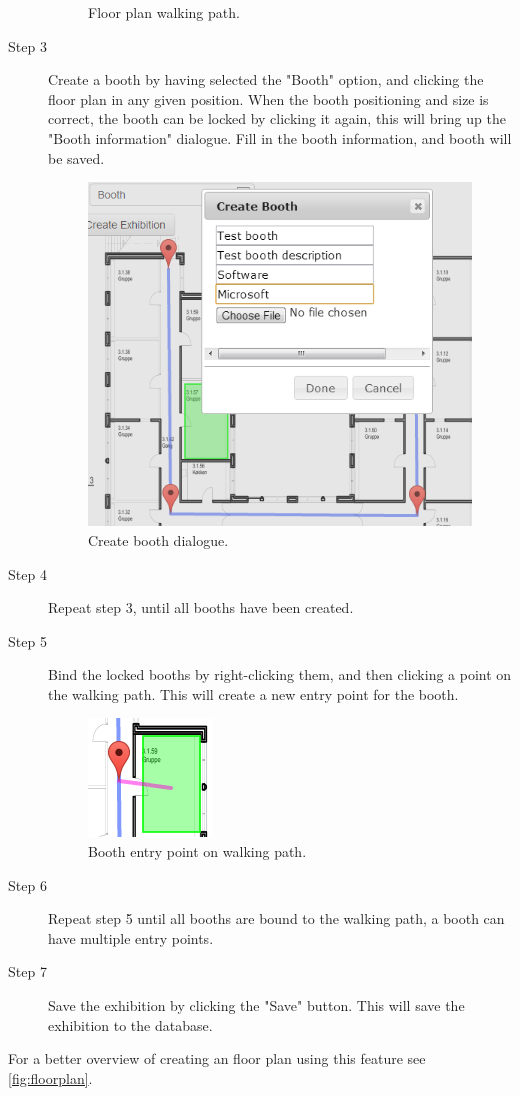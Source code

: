 \begin{description}
\begin{figure}[H]
		\caption{Floor plan walking path.\label{fig:websitestep2}}
	\end{figure}
	\item[Step 3] Create a booth by having selected the "Booth" option, and clicking the floor plan in any given position. When the booth positioning and size is correct, the booth can be locked by clicking it again, this will bring up the "Booth information" dialogue. Fill in the booth information, and booth will be saved.
	\begin{figure}[H]
		\centering
		\includegraphics[scale=0.5]{img/website/step4.png}
		\caption{Create booth dialogue.\label{fig:websitestep3}}
	\end{figure}
	\item[Step 4] Repeat step 3, until all booths have been created.
	\item[Step 5] Bind the locked booths by right-clicking them, and then clicking a point on the walking path. This will create a new entry point for the booth.
	\begin{figure}[H]
		\centering
		\includegraphics[scale=0.5]{img/website/step5.png}
		\caption{Booth entry point on walking path.\label{fig:websitestep5}}
	\end{figure}
	\item[Step 6] Repeat step 5 until all booths are bound to the walking path, a booth can have multiple entry points.
	\item[Step 7] Save the exhibition by clicking the "Save" button. This will save the exhibition to the database.
\end{description}
For a better overview of creating an floor plan using this feature see \autoref{fig:floorplan}.


